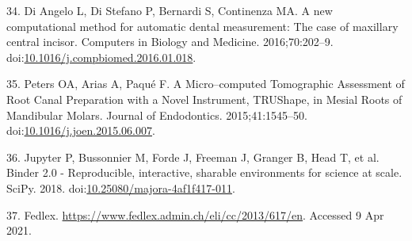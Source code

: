 \documentclass[
  american,
]{article}
\newenvironment{cslreferences}%
  {}%
  {\par}
\begin{document}
\begin{cslreferences}
\leavevmode\hypertarget{ref-1Egw08k0d}{}%
34. Di Angelo L, Di Stefano P, Bernardi S, Continenza MA. A new computational method for automatic dental measurement: The case of maxillary central incisor. Computers in Biology and Medicine. 2016;70:202--9. doi:\href{https://doi.org/10.1016/j.compbiomed.2016.01.018}{10.1016/j.compbiomed.2016.01.018}.

\leavevmode\hypertarget{ref-RxErLYuw}{}%
35. Peters OA, Arias A, Paqué F. A Micro--computed Tomographic Assessment of Root Canal Preparation with a Novel Instrument, TRUShape, in Mesial Roots of Mandibular Molars. Journal of Endodontics. 2015;41:1545--50. doi:\href{https://doi.org/10.1016/j.joen.2015.06.007}{10.1016/j.joen.2015.06.007}.

\leavevmode\hypertarget{ref-Q20Bxdsr}{}%
36. Jupyter P, Bussonnier M, Forde J, Freeman J, Granger B, Head T, et al. Binder 2.0 - Reproducible, interactive, sharable environments for science at scale. SciPy. 2018. doi:\href{https://doi.org/10.25080/majora-4af1f417-011}{10.25080/majora-4af1f417-011}.

\leavevmode\hypertarget{ref-10OKzEtEb}{}%
37. Fedlex. \url{https://www.fedlex.admin.ch/eli/cc/2013/617/en}. Accessed 9 Apr 2021.
\end{cslreferences}
\end{document}
